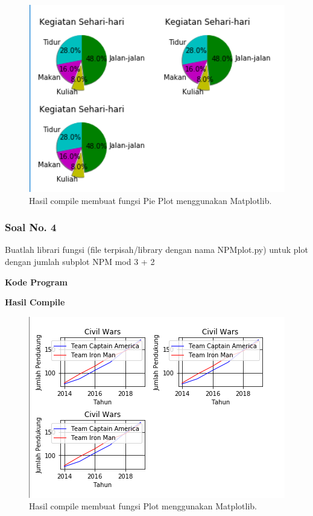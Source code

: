 \begin{figure}[H]
	\includegraphics[width=12cm]{figures/6/1174017/p3.png}
	\centering
	\caption{Hasil compile membuat fungsi Pie Plot menggunakan Matplotlib.}
\end{figure}

\subsubsection{Soal No. 4}
\hfill \break
Buatlah librari fungsi (file terpisah/library dengan nama NPMplot.py) untuk plot dengan jumlah subplot NPM mod 3 + 2

\hfill \break
\textbf{Kode Program}



\hfill \break
\textbf{Hasil Compile}

\begin{figure}[H]
	\includegraphics[width=12cm]{figures/6/1174017/p4.png}
	\centering
	\caption{Hasil compile membuat fungsi Plot menggunakan Matplotlib.}
\end{figure}


